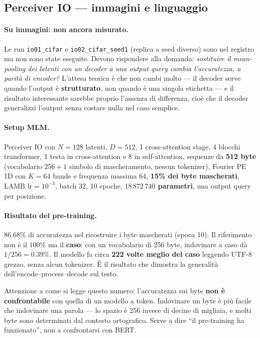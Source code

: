 \documentclass[
  11pt,
]{article}
\begin{document}
\subsection{Perceiver IO --- immagini e linguaggio}
\label{sec:progetto-io}

\paragraph{Su immagini: non ancora misurato.} Le run \texttt{io01\_cifar} e \texttt{io02\_cifar\_seed1} (replica a seed diverso) sono nel registro ma non sono state eseguite. Devono rispondere alla domanda: \emph{sostituire il mean-pooling dei latenti con un decoder a una output query cambia l'accuratezza, a parità di encoder?} L'attesa teorica è che non cambi molto --- il decoder serve quando l'output è \textbf{strutturato}, non quando è una singola etichetta --- e il risultato interessante sarebbe proprio l'assenza di differenza, cioè che il decoder generalizzi l'output senza costare nulla nel caso semplice.

\paragraph{Setup MLM.} Perceiver IO con $N=128$ latenti, $D=512$, 1 cross-attention stage, 4 blocchi transformer, 1 testa in cross-attention e 8 in self-attention, sequenze da \textbf{512 byte} (vocabolario $256 + 1$ simbolo di mascheramento, nessun tokenizer), Fourier PE 1D con $K=64$ bande e frequenza massima 64, \textbf{15\% dei byte mascherati}, LAMB $\text{lr}=10^{-3}$, batch 32, 10 epoche, \textbf{$18\,872\,740$ parametri}, una output query per posizione.

\paragraph{Risultato del pre-training.} $\mathbf{86.68\%}$ di accuratezza nel ricostruire i byte mascherati (epoca 10). Il riferimento non è il $100\%$ ma il \textbf{caso}: con un vocabolario di 256 byte, indovinare a caso dà $1/256 = 0.39\%$. Il modello fa circa \textbf{222 volte meglio del caso} leggendo UTF-8 grezzo, senza alcun tokenizer. È il risultato che dimostra la generalità dell'encode--process--decode sul testo.

Attenzione a come si legge questo numero: l'accuratezza sui byte \textbf{non è confrontabile} con quella di un modello a token. Indovinare un byte è più facile che indovinare una parola --- lo spazio è 256 invece di decine di migliaia, e molti byte sono determinati dal contesto ortografico. Serve a dire ``il pre-training ha funzionato'', non a confrontarsi con BERT.
\end{document}
